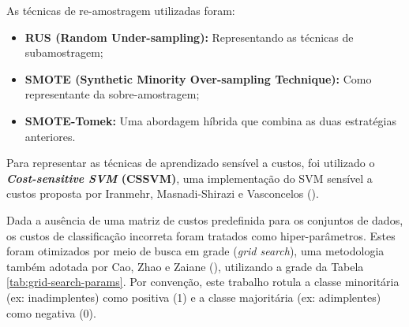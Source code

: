 As técnicas de re-amostragem utilizadas foram:
\begin{itemize}
  \item \textbf{RUS (Random Under-sampling):} Representando as técnicas de subamostragem;
  \item \textbf{SMOTE (Synthetic Minority Over-sampling Technique):} Como representante da sobre-amostragem;
  \item \textbf{SMOTE-Tomek:} Uma abordagem híbrida que combina as duas estratégias anteriores.
\end{itemize}
Para representar as técnicas de aprendizado sensível a custos, foi utilizado o \textbf{\textit{Cost-sensitive SVM} (CSSVM)}, uma implementação do SVM sensível a custos proposta por Iranmehr, Masnadi-Shirazi e Vasconcelos (\citeyear{Iranmehr2019}).

Dada a ausência de uma matriz de custos predefinida para os conjuntos de dados, os custos de classificação incorreta foram tratados como hiper-parâmetros. Estes foram otimizados por meio de busca em grade (\textit{grid search}), uma metodologia também adotada por Cao, Zhao e Zaiane (\citeyear{Cao2013}), utilizando a grade da Tabela \ref{tab:grid-search-params}. Por convenção, este trabalho rotula a classe minoritária (ex: inadimplentes) como positiva (1) e a classe majoritária (ex: adimplentes) como negativa (0).

